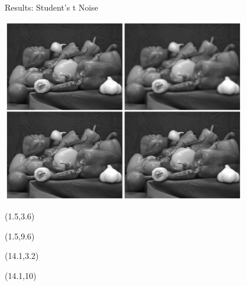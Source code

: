 \documentclass[12pt]{beamer}
\begin{document}
\begin{frame}{Results: Student's t Noise}
\begin{center}
\vspace{-3 mm}
\includegraphics[width = 0.8\textwidth]{../figures/waveletStudent.pdf} 
\end{center}

\begin{textblock}{5}(1.5,3.6)
\end{textblock}

\begin{textblock}{5}(1.5,9.6)
\end{textblock}

\begin{textblock}{5}(14.1,3.2)
\end{textblock}

\begin{textblock}{5}(14.1,10)
\end{textblock}
\end{frame}
\end{document}
